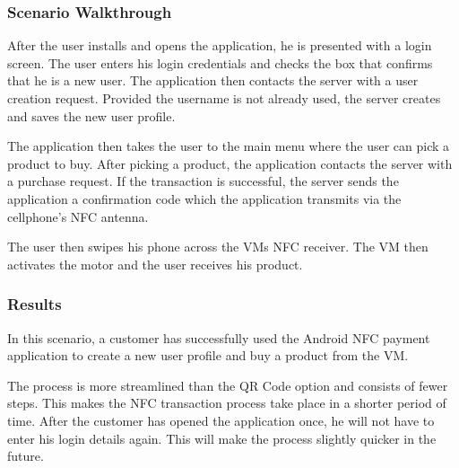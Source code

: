 \subsubsection{Scenario Walkthrough}

After the user installs and opens the application, he is presented with a login
screen. The user enters his login credentials and checks the box that confirms
that he is a new user. The application then contacts the server with a user
creation request. Provided the username is not already used, the server creates
and saves the new user profile.

The application then takes the user to the main menu where the user can pick
a product to buy. After picking a product, the application contacts the server
with a purchase request. If the transaction is successful, the server sends the
application a confirmation code which the application transmits via the
cellphone's NFC antenna.

The user then swipes his phone across the VMs NFC receiver. The
VM then activates the motor and the user receives his product. 

\subsubsection{Results}

In this scenario, a customer has successfully used the Android NFC payment application to
create a new user profile and buy a product from the VM. 

The process is more streamlined than the QR Code option and consists of fewer steps. This
makes the NFC transaction process take place in a shorter period of time. After the
customer has opened the application once, he will not have to enter his login details
again. This will make the process slightly quicker in the future.  